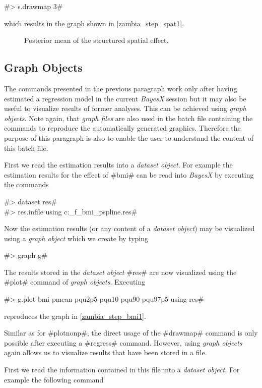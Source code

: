 \documentclass[11pt,a4paper,twoside]{bayesxreport}
\begin{document}
#> s.drawmap 3#

which results in the graph shown in \autoref{zambia_step_spat1}.

\begin{figure}[ht]
\begin{center}
{\it\caption{Posterior mean of the structured spatial
effect.\label{zambia_step_spat1}}}
\end{center}
\end{figure}

\subsection{Graph Objects}

The commands presented in the previous paragraph work only after
having estimated a regression model in the current {\em BayesX}
session but it may also be useful to visualize results of former
analyses. This can be achieved using {\em graph objects}. Note
again, that {\em graph files} are also used in the batch file
containing the commands to reproduce the automatically generated
graphics. Therefore the purpose of this paragraph is also to enable
the user to understand the content of this batch file.

First we read the estimation results into a {\it dataset object}.
For example the estimation results for the effect of #bmi# can be
read into {\it BayesX} by executing the commands

#> dataset res#\\
#> res.infile using c:\data\s_f_bmi_pspline.res#

Now the estimation results (or any content of a {\it dataset
object}) may be visualized using a {\it graph object} which we
create by typing

#> graph g#

The results stored in the {\em dataset object} #res# are now
visualized using the #plot# command of {\it graph objects}.
Executing

#> g.plot bmi pmean pqu2p5 pqu10 pqu90 pqu97p5 using res#

reproduces the graph in \autoref{zambia_step_bmi1}.

Similar as for #plotnonp#, the direct usage of the #drawmap# command
is only possible after executing a #regress# command. However, using
{\it graph objects} again allows us to visualize results that have
been stored in a file.

First we read the information contained in this file into a {\it
dataset object}. For example the following command
\end{document}
